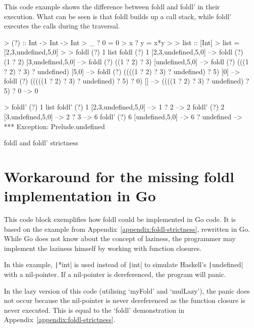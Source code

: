 This code example shows the difference between foldl and foldl' in their
execution. What can be seen is that foldl builds up a call stack, while
foldl' executes the calls during the traversal.

\begin{code}
    \begin{haskellcode}
> (?) :: Int -> Int -> Int
> _ ? 0 = 0
> x ? y = x*y
>
> list :: [Int]
> list = [2,3,undefined,5,0]
>
> foldl (?) 1 list
foldl (?) 1 [2,3,undefined,5,0] -->
foldl (?) (1 ? 2) [3,undefined,5,0] -->
foldl (?) ((1 ? 2) ? 3) [undefined,5,0] -->
foldl (?) (((1 ? 2) ? 3) ? undefined) [5,0] -->
foldl (?) ((((1 ? 2) ? 3) ? undefined) ? 5) [0] -->
foldl (?) (((((1 ? 2) ? 3) ? undefined) ? 5) ? 0) [] -->
((((1 ? 2) ? 3) ? undefined) ? 5) ? 0 -->
0

> foldl' (?) 1 list
foldl' (?) 1 [2,3,undefined,5,0] -->
    1 ? 2 --> 2
foldl' (?) 2 [3,undefined,5,0] -->
    2 ? 3 --> 6
foldl' (?) 6 [undefined,5,0] -->
    6 ? undefined -->
*** Exception: Prelude.undefined
    \end{haskellcode}
    \caption{foldl and foldl' strictness\autocite{fold-types}}
\end{code}

\section{Workaround for the missing foldl implementation in Go}\label{appendix:foldl-go}


This code block exemplifies how foldl could be implemented in Go code. It is based on the example
from Appendix~\ref{appendix:foldl-strictness}, rewritten in Go. While Go does not know about
the concept of laziness, the programmer may implement the laziness himself by working with function
closures.

In this example, \texttt|*int| is used instead of \texttt|int| to simulate Haskell's
\texttt|undefined| with a nil-pointer.
If a nil-pointer is dereferenced, the program will panic.

In the lazy version of this code (utilising `myFold' and `mulLazy'), the panic does not occur because
the nil-pointer is never dereferenced as the function closure is never executed. This is equal
to the `foldl' demonstration in Appendix~\ref{appendix:foldl-strictness}.

